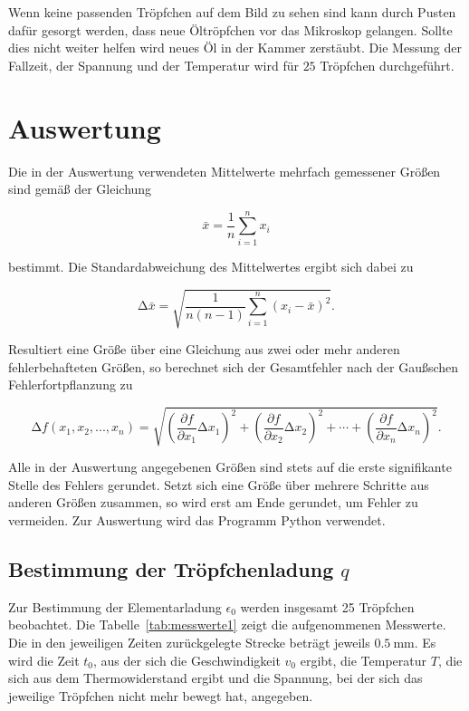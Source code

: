\documentclass[
  bibliography=totoc,     %
  captions=tableheading,  %
  titlepage=firstiscover, %
]{scrartcl}
\begin{document}
\noindent
Wenn keine passenden Tröpfchen auf dem Bild zu sehen sind kann durch
Pusten dafür gesorgt werden, dass neue Öltröpfchen vor das Mikroskop
gelangen. Sollte dies nicht weiter helfen wird neues Öl in der Kammer
zerstäubt. Die Messung der Fallzeit, der Spannung und der Temperatur
wird für $25$ Tröpfchen durchgeführt.
\clearpage

\section{Auswertung}
\label{sec:auswertung}
Die in der Auswertung verwendeten Mittelwerte mehrfach gemessener Größen sind gemäß der
Gleichung

\begin{equation}
    \bar{x}=\frac{1}{n}\sum_{i=1}^n x_i
    \label{eq:mittelwert}
\end{equation}

bestimmt. Die Standardabweichung des Mittelwertes ergibt sich dabei zu

\begin{equation}
    \mathup{\Delta}\bar{x}=\sqrt{\frac{1}{n(n-1)}\sum_{i=1}^n\left(x_i-\bar{x}\right)^2}.
    \label{eq:standardabweichung}
\end{equation}

Resultiert eine Größe über eine Gleichung aus zwei oder mehr anderen fehlerbehafteten Größen, so
berechnet sich der Gesamtfehler nach der Gaußschen Fehlerfortpflanzung zu

\begin{equation}
    \mathup{\Delta}f(x_1,x_2,...,x_n)=\sqrt{\left(\frac{\partial f}{\partial x_1}\mathup{\Delta}x_1\right)^2+\left(\frac{\partial f}{\partial x_2}\mathup{\Delta}x_2\right)^2+ \dotsb +\left(\frac{\partial f}{\partial x_n}\mathup{\Delta}x_n\right)^2}.
    \label{eq:fehlerfortpflanzung}
\end{equation}

Alle in der Auswertung angegebenen Größen sind stets auf die erste signifikante Stelle des
Fehlers gerundet. Setzt sich eine Größe über mehrere Schritte aus anderen Größen zusammen,
so wird erst am Ende gerundet, um Fehler zu vermeiden. Zur Auswertung wird das Programm Python verwendet.
\subsection{Bestimmung der Tröpfchenladung \texorpdfstring{$q$}{q}}

Zur Bestimmung der Elementarladung $\epsilon_0$ werden insgesamt 25 Tröpfchen beobachtet. Die Tabelle~\ref{tab:messwerte1} zeigt die aufgenommenen Messwerte. Die in den jeweiligen Zeiten zurückgelegte Strecke beträgt jeweils $\SI{0.5}{\milli\metre}$. Es wird die Zeit $t_0$, aus der sich die Geschwindigkeit $v_0$ ergibt, die Temperatur $T$, die sich aus dem Thermowiderstand ergibt und die Spannung, bei der sich das jeweilige Tröpfchen nicht mehr bewegt hat, angegeben.
\end{document}
